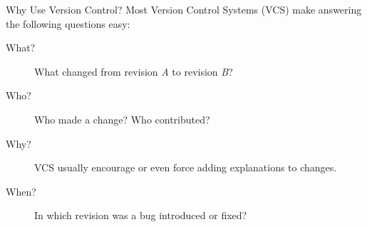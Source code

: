 \begin{frame}[c]{Why Use Version Control?}
  Most Version Control Systems (VCS) make answering the following questions easy:
  \begin{description}
    \item[What?] What changed from revision \emph{A} to revision \emph{B}?
    \item[Who?] Who made a change? Who contributed?
    \item[Why?] VCS usually encourage or even force adding explanations to changes.
    \item[When?] In which revision was a bug introduced or fixed?
  \end{description}

\end{frame}
